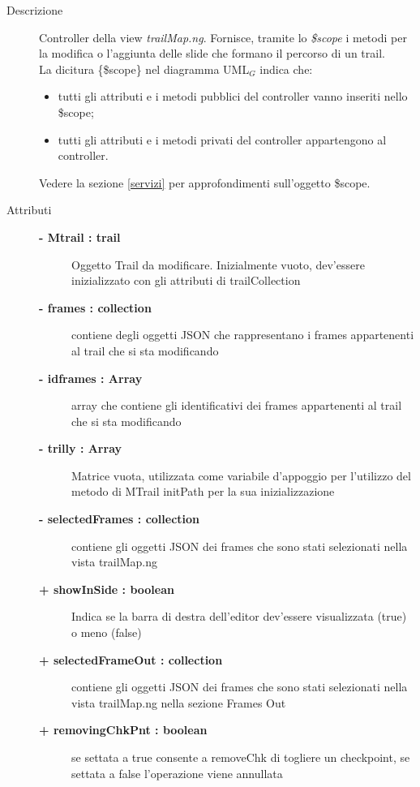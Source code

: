 \begin{description}
\item[Descrizione] \hfill
	Controller della view \textit{trailMap.ng}. Fornisce, tramite lo \textit{\$scope} i metodi per la modifica o l'aggiunta delle slide che formano il percorso di un trail. 
	\\ La dicitura \{\$scope\} nel diagramma UML$_G$ indica che:
\begin{itemize}
\item tutti gli attributi e i metodi pubblici del controller vanno inseriti nello \$scope;
\item tutti gli attributi e i metodi privati del controller appartengono al controller.
\end{itemize}
Vedere la sezione \ref{servizi} per approfondimenti sull'oggetto \$scope.
	
\item[Attributi] \hfill
	\begin{description}
		\item[\textbf{- Mtrail : trail			}] \hfill
			Oggetto Trail da modificare. Inizialmente vuoto, dev’essere inizializzato
con gli attributi di trailCollection
		\item[\textbf{- frames : collection			}] \hfill
			contiene	 degli oggetti JSON che rappresentano i frames appartenenti al trail che si sta modificando
		\item[\textbf{- idframes : Array			}] \hfill			
			array che contiene gli identificativi dei frames appartenenti al trail che si sta modificando		
		\item[\textbf{- trilly : Array			}] \hfill			
			Matrice vuota, utilizzata come variabile d’appoggio per l’utilizzo del metodo
di MTrail initPath per la sua inizializzazione
		\item[\textbf{- selectedFrames : collection			}] \hfill			
			contiene gli oggetti JSON dei frames che sono stati selezionati nella vista trailMap.ng %
		\item[\textbf{+ showInSide : boolean			}] \hfill			
			Indica se la barra di destra dell’editor dev’essere visualizzata (true) o meno
(false)
		\item[\textbf{+ selectedFrameOut : collection			}] \hfill			
			contiene gli oggetti JSON dei frames che sono stati selezionati nella vista trailMap.ng nella sezione Frames Out
		\item[\textbf{+ removingChkPnt : boolean			}] \hfill			
			se settata a true consente a removeChk di togliere un checkpoint, se settata a false l'operazione viene annullata			
	\end{description}
	

\end{description}
